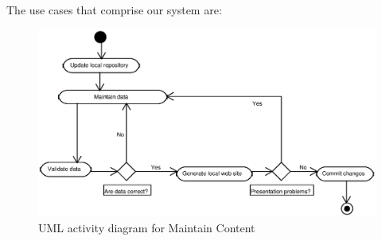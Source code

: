 \documentclass[10pt]{article}
\begin{document}
The use cases that comprise our system are:

\begin{figure}
\includegraphics[scale=0.6]{maintain-content-activity}
\caption{UML activity diagram for Maintain Content}
\label{fig:maintain-content-diagram}
\end{figure}
\end{document}
